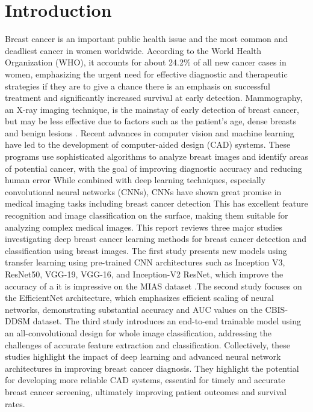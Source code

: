 \documentclass[12]{article}
\begin{document}
\section{Introduction}
Breast cancer is an important public health issue and the most common and deadliest cancer in women worldwide. According to the World Health Organization (WHO), it accounts for about 24.2\% of all new cancer cases in women, emphasizing the urgent need for effective diagnostic and therapeutic strategies if they are to give a chance there is an emphasis on successful treatment and significantly increased survival at early detection. Mammography, an X-ray imaging technique, is the mainstay of early detection of breast cancer, but may be less effective due to factors such as the patient’s age, dense breasts and benign lesions .
\newline
Recent advances in computer vision and machine learning have led to the development of computer-aided design (CAD) systems. These programs use sophisticated algorithms to analyze breast images and identify areas of potential cancer, with the goal of improving diagnostic accuracy and reducing human error While combined with deep learning techniques, especially convolutional neural networks (CNNs), CNNs have shown great promise in medical imaging tasks including breast cancer detection This has excellent feature recognition and image classification on the surface, making them suitable for analyzing complex medical images.
\newline
This report reviews three major studies investigating deep breast cancer learning methods for breast cancer detection and classification using breast images. The first study presents new models using transfer learning using pre-trained CNN architectures such as Inception V3, ResNet50, VGG-19, VGG-16, and Inception-V2 ResNet, which improve the accuracy of a it is impressive on the MIAS dataset .The second study focuses on the EfficientNet architecture, which emphasizes efficient scaling of neural networks, demonstrating substantial accuracy and AUC values on the CBIS-DDSM dataset. The third study introduces an end-to-end trainable model using an all-convolutional design for whole image classification, addressing the challenges of accurate feature extraction and classification.
\newline
Collectively, these studies highlight the  impact of deep learning and advanced neural network architectures in improving breast cancer diagnosis. They highlight the potential for developing more reliable CAD systems, essential for timely and accurate breast cancer screening, ultimately improving patient outcomes and survival rates.
\end{document}
